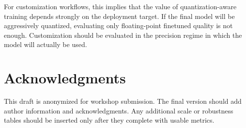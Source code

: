\documentclass[11pt]{article}
\begin{document}
For customization workflows, this implies that the value of quantization-aware training depends strongly on the deployment target. If the final model will be aggressively quantized, evaluating only floating-point finetuned quality is not enough. Customization should be evaluated in the precision regime in which the model will actually be used.

\section*{Acknowledgments}

This draft is anonymized for workshop submission. The final version should add author information and acknowledgments. Any additional scale or robustness tables should be inserted only after they complete with usable metrics.



\end{document}
